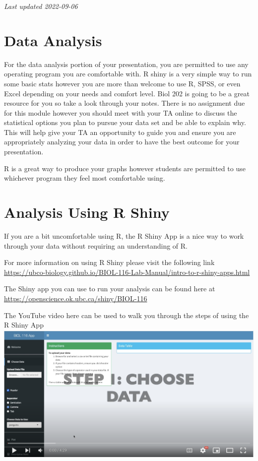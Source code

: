 \documentclass[
]{book}
\begin{document}
\emph{Last updated 2022-09-06}

\hypertarget{data-analysis}{%
\chapter*{Data Analysis}\label{data-analysis}}

For the data analysis portion of your presentation, you are permitted to use any operating program you are comfortable with. R shiny is a very simple way to run some basic stats however you are more than welcome to use R, SPSS, or even Excel depending on your needs and comfort level. Biol 202 is going to be a great resource for you so take a look through your notes. There is no assignment due for this module however you should meet with your TA online to discuss the statistical options you plan to pursue your data set and be able to explain why. This will help give your TA an opportunity to guide you and ensure you are appropriately analyzing your data in order to have the best outcome for your presentation.

R is a great way to produce your graphs however students are permitted to use whichever program they feel most comfortable using.

\hypertarget{analysis-using-r-shiny}{%
\chapter*{Analysis Using R Shiny}\label{analysis-using-r-shiny}}

If you are a bit uncomfortable using R, the R Shiny App is a nice way to work through your data without requiring an understanding of R.

For more information on using R Shiny please visit the following link \url{https://ubco-biology.github.io/BIOL-116-Lab-Manual/intro-to-r-shiny-apps.html}

The Shiny app you can use to run your analysis can be found here at \url{https://openscience.ok.ubc.ca/shiny/BIOL-116}

The YouTube video here can be used to walk you through the steps of using the R Shiny App \includegraphics{images/shiny-app.png}
\end{document}
